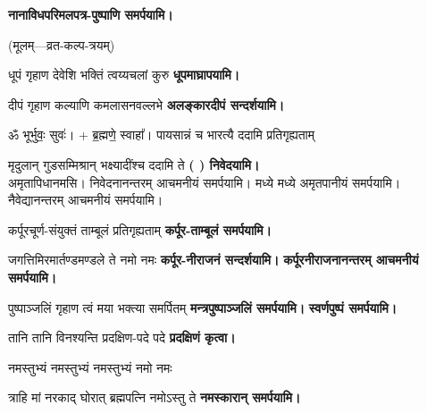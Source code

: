\begingroup
\centering
\setlength{\columnseprule}{1pt}
\let\chapt\sect
\needspace{6em}




\endgroup

\textbf{\devAya{} नानाविध\-परिमल\-पत्र-पुष्पाणि समर्पयामि।}

\centerline{\small{(मूलम्—व्रत-कल्प-त्रयम्)}}
\begin{center}

{धूपं गृहाण देवेशि भक्तिं त्वय्यचलां कुरु}
\textbf{\devAya{} धूपमाघ्रापयामि।}
\medskip

{दीपं गृहाण कल्याणि कमलासनवल्लभे}
\textbf{\devAya{} अलङ्कारदीपं सन्दर्शयामि।}
\medskip

ॐ भूर्भुवः॒ सुवः॑। + ब्र॒ह्मणे॒ स्वाहा᳚।
{पायसान्नं च भारत्यै ददामि प्रतिगृह्यताम्}

{मृदुलान् गुडसम्मिश्रान् भक्ष्यादींश्च ददामि ते}
\textbf{\devAya (   ) निवेदयामि।}\\
अमृतापिधानमसि। निवेदनानन्तरम् आचमनीयं समर्पयामि।
मध्ये मध्ये अमृतपानीयं समर्पयामि।
नैवेद्यानन्तरम् आचमनीयं समर्पयामि।
\medskip

{कर्पूरचूर्ण-संयुक्तं ताम्बूलं प्रतिगृह्यताम्}
\textbf{\devAya{} कर्पूर-ताम्बूलं समर्पयामि।}
\medskip

{जगत्तिमिरमार्तण्डमण्डले ते नमो नमः}
\textbf{\devAya{} कर्पूर-नीराजनं सन्दर्शयामि।}
\textbf{कर्पूरनीराजनानन्तरम् आचमनीयं समर्पयामि।}
\medskip

{पुष्पाञ्जलिं गृहाण त्वं मया भक्त्या समर्पितम्}
\textbf{\devAya{} मन्त्रपुष्पाञ्जलिं समर्पयामि।}
\textbf{स्वर्णपुष्पं समर्पयामि।}
\medskip

{तानि तानि विनश्यन्ति प्रदक्षिण-पदे पदे}
\textbf{प्रदक्षिणं कृत्वा।}
\medskip

{नमस्तुभ्यं नमस्तुभ्यं नमस्तुभ्यं नमो नमः}

{त्राहि मां नरकाद् घोरात् ब्रह्मपत्नि नमोऽस्तु ते}
\textbf{\devAya{} नमस्कारान् समर्पयामि।}
\medskip


\end{center}
